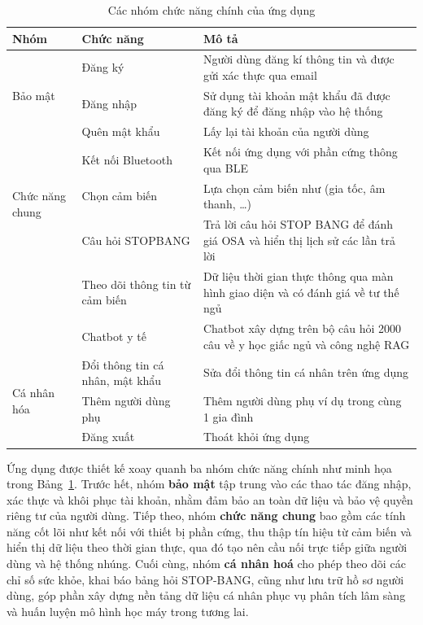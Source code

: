 \begin{table}[htbp]
\centering
\caption{Các nhóm chức năng chính của ứng dụng}
\label{tab:app_features}
\begin{tabularx}{\textwidth}{|l|l|X|}
\hline
\textbf{Nhóm} & \textbf{Chức năng} & \textbf{Mô tả} \\ \hline
\multirow{3}{*}{Bảo mật} 
 & Đăng ký & Người dùng đăng kí thông tin và được gửi xác thực qua email \\ \cline{2-3}
 & Đăng nhập & Sử dụng tài khoản mật khẩu đã được đăng ký để đăng nhập vào hệ thống \\ \cline{2-3}
 & Quên mật khẩu & Lấy lại tài khoản của người dùng \\ \hline
\multirow{3}{*}{Chức năng chung} 
 & Kết nối Bluetooth & Kết nối ứng dụng với phần cứng thông qua BLE \\ \cline{2-3}
 & Chọn cảm biến & Lựa chọn cảm biến như (gia tốc, âm thanh, \ldots) \\ \cline{2-3}
 & Câu hỏi STOPBANG & Trả lời câu hỏi STOP BANG để đánh giá OSA và hiển thị lịch sử các lần trả lời \\ \cline{2-3}
 & Theo dõi thông tin từ cảm biến & Dữ liệu thời gian thực thông qua màn hình giao diện và có đánh giá về tư thế ngủ \\ \cline{2-3}
 & Chatbot y tế& Chatbot xây dựng trên bộ câu hỏi 2000 câu về y học giấc ngủ và công nghệ RAG \\ \hline
\multirow{3}{*}{Cá nhân hóa} 
 & Đổi thông tin cá nhân, mật khẩu & Sửa đổi thông tin cá nhân trên ứng dụng \\ \cline{2-3}
 & Thêm người dùng phụ & Thêm người dùng phụ ví dụ trong cùng 1 gia đình \\ \cline{2-3}
 & Đăng xuất & Thoát khỏi ứng dụng \\ \hline
\end{tabularx}
\end{table}

Ứng dụng được thiết kế xoay quanh ba nhóm chức năng chính như minh họa trong 
Bảng~\ref{tab:app_features}. Trước hết, nhóm \textbf{bảo mật} tập trung vào các thao tác 
đăng nhập, xác thực và khôi phục tài khoản, nhằm đảm bảo an toàn dữ liệu và bảo vệ quyền 
riêng tư của người dùng. Tiếp theo, nhóm \textbf{chức năng chung} bao gồm các tính năng 
cốt lõi như kết nối với thiết bị phần cứng, thu thập tín hiệu từ cảm biến và hiển thị dữ liệu 
theo thời gian thực, qua đó tạo nên cầu nối trực tiếp giữa người dùng và hệ thống nhúng. 
Cuối cùng, nhóm \textbf{cá nhân hoá} cho phép theo dõi các chỉ số sức khỏe, khai báo bảng 
hỏi STOP-BANG, cũng như lưu trữ hồ sơ người dùng, góp phần xây dựng nền tảng dữ liệu 
cá nhân phục vụ phân tích lâm sàng và huấn luyện mô hình học máy trong tương lai.

